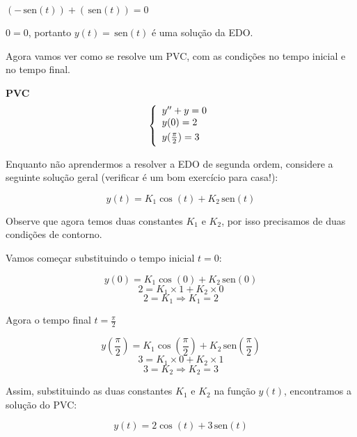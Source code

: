 \documentclass[a4paper]{article}
\providecommand{\sin}{} \renewcommand{\sin}{\hspace{2pt}\mathrm{sen}}
\begin{document}
$\left(-\sin(t)\right) + \left(\sin(t)\right) =0$

$0=0$, portanto $y(t) = \sin(t)$ é uma solução da EDO.


Agora vamos ver como se resolve um PVC, com as condições no tempo
inicial e no tempo final.

{\bf PVC}
\begin{displaymath}
  \left\{
    \begin{array}{l}
      y'' + y=0\\
      \smallskip
      y(0)=2\\
      \smallskip
      y(\frac{\pi}{2})=3
    \end{array}
  \right.
\end{displaymath}

Enquanto não aprendermos a resolver a EDO de segunda ordem, considere
a seguinte solução geral (verificar é um bom exercício para casa!):

\begin{displaymath}
  y(t) = K_1\cos(t) + K_2\sin(t)
\end{displaymath}

Observe que agora temos duas constantes $K_1$ e $K_2$, por isso
precisamos de duas condições de contorno.

Vamos começar substituindo o tempo inicial $t=0$:

\begin{displaymath}
  y(0)= K_1\cos(0) + K_2\sin(0)
\end{displaymath}
\begin{displaymath}
  2 = K_1 \times 1 + K_2 \times 0
\end{displaymath}
\begin{displaymath}
  2=K_1 \Rightarrow K_1 = 2
\end{displaymath}

Agora o tempo final $t=\frac{\pi}{2}$

\begin{displaymath}
  y(\frac{\pi}{2}) = K_1 \cos(\frac{\pi}{2}) + K_2\sin(\frac{\pi}{2})
\end{displaymath}
\begin{displaymath}
  3 = K_1 \times 0 + K_2\times 1
\end{displaymath}
\begin{displaymath}
  3 = K_2 \Rightarrow K_2 = 3
\end{displaymath}

Assim, substituindo as duas constantes $K_1$ e $K_2$ na função $y(t)$,
encontramos a solução do PVC:

\begin{displaymath}
  y(t) = 2\cos(t) + 3\sin(t)
\end{displaymath}
\end{document}
